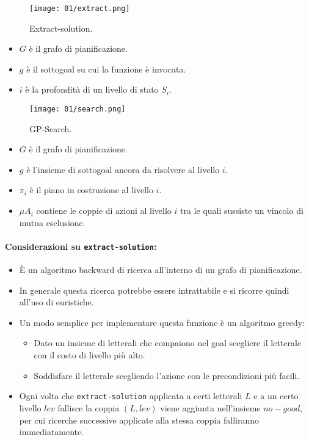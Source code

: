 \begin{figure}[h]
    \centering
    \texttt{[image: 01/extract.png]}
    \caption{Extract-solution.}
\end{figure}

\begin{itemize}
  \item $G$ è il grafo di pianificazione. 
  \item $g$ è il sottogoal su cui la funzione è invocata. 
  \item $i$ è la profondità di un livello di stato $S_i$. 
\end{itemize}

\begin{figure}[h]
    \centering
    \texttt{[image: 01/search.png]}
    \caption{GP-Search.}
\end{figure}

\begin{itemize}
  \item $G$ è il grafo di pianificazione. 
  \item $g$ è l'insieme di sottogoal ancora da risolvere al livello $i$. 
  \item $\pi_i$ è il piano in costruzione al livello $i$.
  \item $\mu A_i$ contiene le coppie di azioni al livello $i$ tra le quali sussiste un vincolo di mutua esclusione.
\end{itemize}

\paragraph{Considerazioni su \texttt{extract-solution}:}

\begin{itemize}
  \item È un algoritmo backward di ricerca all'interno di un grafo di pianificazione. 
  \item In generale questa ricerca potrebbe essere intrattabile e si ricorre quindi all'uso di euristiche. 
  \item Un modo semplice per implementare questa funzione  è un algoritmo greedy:
    \begin{itemize}
      \item Dato un insieme di letterali che compaiono nel goal scegliere il letterale con il costo di livello più alto. 
      \item Soddisfare il letterale scegliendo l'azione con le precondizioni più facili.
    \end{itemize}
  \item Ogni volta che \texttt{extract-solution} applicata a certi letterali $L$ e a un certo livello $lev$ fallisce la coppia $(L, lev)$ viene aggiunta nell'insieme $no-good$, per cui ricerche successive applicate alla stessa coppia falliranno immediatamente.
\end{itemize}

